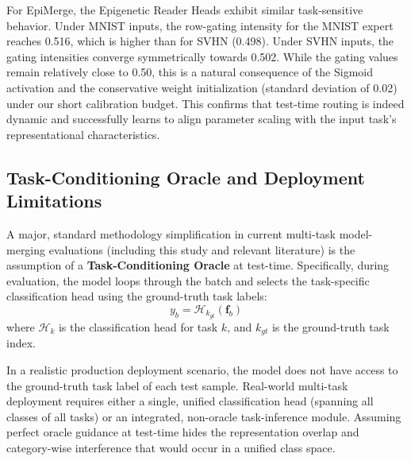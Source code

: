 For EpiMerge, the Epigenetic Reader Heads exhibit similar task-sensitive behavior. Under MNIST inputs, the row-gating intensity for the MNIST expert reaches 0.516, which is higher than for SVHN (0.498). Under SVHN inputs, the gating intensities converge symmetrically towards 0.502. 
While the gating values remain relatively close to 0.50, this is a natural consequence of the Sigmoid activation and the conservative weight initialization (standard deviation of 0.02) under our short calibration budget. This confirms that test-time routing is indeed dynamic and successfully learns to align parameter scaling with the input task's representational characteristics.

\subsection{Task-Conditioning Oracle and Deployment Limitations}
A major, standard methodology simplification in current multi-task model-merging evaluations (including this study and relevant literature) is the assumption of a \textbf{Task-Conditioning Oracle} at test-time. Specifically, during evaluation, the model loops through the batch and selects the task-specific classification head using the ground-truth task labels:
\begin{equation}
    y_b = \mathcal{H}_{k_{gt}}\left(\mathbf{f}_b\right)
\end{equation}
where $\mathcal{H}_k$ is the classification head for task $k$, and $k_{gt}$ is the ground-truth task index.

In a realistic production deployment scenario, the model does not have access to the ground-truth task label of each test sample. Real-world multi-task deployment requires either a single, unified classification head (spanning all classes of all tasks) or an integrated, non-oracle task-inference module. Assuming perfect oracle guidance at test-time hides the representation overlap and category-wise interference that would occur in a unified class space.

